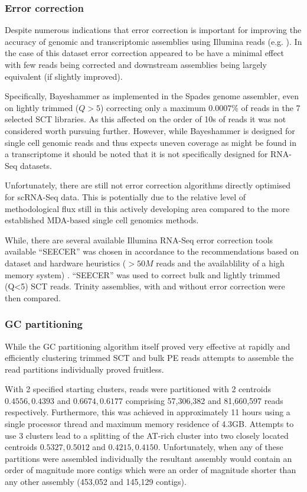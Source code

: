 \subsubsection{Error correction}

Despite numerous indications that error correction is important for improving the accuracy
of genomic and transcriptomic assemblies using Illumina reads (e.g. \citep{Molnar2014,Macmanes2015}).
In the case of this dataset error correction appeared to be have a minimal effect with few
reads being corrected and downstream assemblies being largely equivalent (if slightly improved).

Specifically, Bayeshammer as implemented in the Spades genome assembler, even on lightly trimmed
(\(Q>5\)) correcting only a maximum \(0.0007\%\) of reads in the 7 selected SCT libraries.
As this affected on the order of 10s of reads it was not considered worth pursuing further.
However, while Bayeshammer is designed for single cell genomic reads and 
thus expects uneven coverage as might be found in a transcriptome it should be noted that it is not specifically designed for RNA-Seq datasets.


Unfortunately, there are still not error correction algorithms directly optimised for scRNA-Seq 
data.  This is potentially due to the relative level of methodological flux still in this 
actively developing area compared to the more established MDA-based single cell genomics methods.

While, there are several available Illumina RNA-Seq error correction tools available 
``SEECER'' was chosen in accordance to the recommendations based on dataset and hardware
heuristics (\(>50M\) reads and the availablility of a high memory system) \citep{Macmanes2015}.
``SEECER'' was used to correct bulk and lightly trimmed (Q<5) SCT reads.  Trinity assemblies, with and without
error correction were then compared.


\subsubsection{GC partitioning}
While the GC partitioning algorithm itself proved very effective at rapidly and efficiently clustering 
trimmed SCT and bulk PE reads attempts to assemble the read partitions individually proved fruitless.

With 2 specified starting clusters, reads were partitioned with 2 centroids \(0.4556, 0.4393\) and
\(0.6674, 0.6177\) comprising 57,306,382 and 81,660,597 reads respectively. Furthermore, this 
was achieved in approximately 11 hours using a single processor thread and maximum memory residence
of 4.3GB.  Attempts to use 3 clusters lead to a splitting of the AT-rich cluster into two closely 
located centroids \(0.5327, 0.5012\) and \(0.4215, 0.4150\).  Unfortunately, when 
any of these partitions were assembled individually the resultant assembly would 
contain an order of magnitude more contigs which were an order of magnitude shorter than any other
assembly (453,052 and 145,129 contigs).

